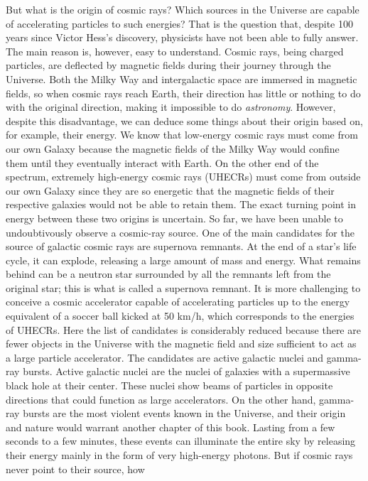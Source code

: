 \documentclass[
  letterpaper,
  DIV=11,
  numbers=noendperiod]{scrreprt}
\begin{document}
But what is the origin of cosmic rays? Which sources in the Universe are
capable of accelerating particles to such energies? That is the question
that, despite 100 years since Victor Hess's discovery, physicists have
not been able to fully answer. The main reason is, however, easy to
understand. Cosmic rays, being charged particles, are deflected by
magnetic fields during their journey through the Universe. Both the
Milky Way and intergalactic space are immersed in magnetic fields, so
when cosmic rays reach Earth, their direction has little or nothing to
do with the original direction, making it impossible to do
\emph{astronomy}. However, despite this disadvantage, we can deduce some
things about their origin based on, for example, their energy. We know
that low-energy cosmic rays must come from our own Galaxy because the
magnetic fields of the Milky Way would confine them until they
eventually interact with Earth. On the other end of the spectrum,
extremely high-energy cosmic rays (UHECRs) must come from outside our
own Galaxy since they are so energetic that the magnetic fields of their
respective galaxies would not be able to retain them. The exact turning
point in energy between these two origins is uncertain. So far, we have
been unable to undoubtivously observe a cosmic-ray source. One of the
main candidates for the source of galactic cosmic rays are supernova
remnants. At the end of a star's life cycle, it can explode, releasing a
large amount of mass and energy. What remains behind can be a neutron
star surrounded by all the remnants left from the original star; this is
what is called a supernova remnant. It is more challenging to conceive a
cosmic accelerator capable of accelerating particles up to the energy
equivalent of a soccer ball kicked at 50 km/h, which corresponds to the
energies of UHECRs. Here the list of candidates is considerably reduced
because there are fewer objects in the Universe with the magnetic field
and size sufficient to act as a large particle accelerator. The
candidates are active galactic nuclei and gamma-ray bursts. Active
galactic nuclei are the nuclei of galaxies with a supermassive black
hole at their center. These nuclei show beams of particles in opposite
directions that could function as large accelerators. On the other hand,
gamma-ray bursts are the most violent events known in the Universe, and
their origin and nature would warrant another chapter of this book.
Lasting from a few seconds to a few minutes, these events can illuminate
the entire sky by releasing their energy mainly in the form of very
high-energy photons. But if cosmic rays never point to their source, how
\end{document}
